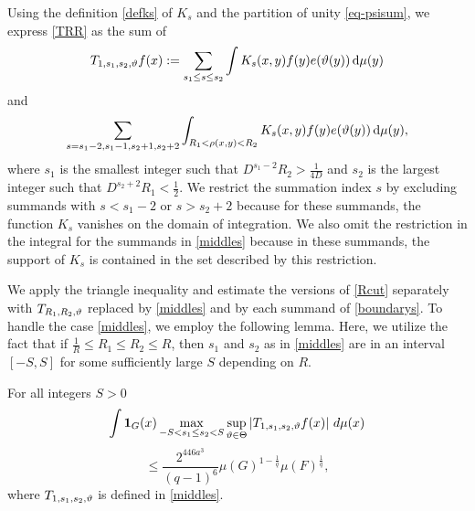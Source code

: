 Using the definition \eqref{defks} of $K_s$ and the partition of unity \eqref{eq-psisum}, we express \eqref{TRR} as the sum of
\begin{equation}\label{middles}
{T}_{1,s_1,s_2,{\vartheta}}f(x):=\sum_{s_1 \le s\le s_2}
\int K_s(x,y) f(y) e({\vartheta}(y)) \, \mathrm{d}\mu(y)
\end{equation}
and
\begin{equation}\label{boundarys}
\sum_{s=s_1-2,s_1-1, s_2+1, s_2+2}
\int_{R_1 < \rho(x,y) < R_2} K_s(x,y) f(y) e({\vartheta}(y)) \,
 \mathrm{d}\mu(y),
\end{equation}
where $s_1$ is the smallest integer such that $D^{s_1-2}R_2>\frac 1{4D}$ and $s_2$ is the largest integer such that $D^{s_2+2}R_1<\frac 12$. We restrict the summation index $s$ by excluding summands with $s<s_1-2$ or $s>s_2+2$ because for these summands, the function $K_s$ vanishes on the domain of integration. We also omit the restriction in the integral for the summands in \eqref{middles} because in these summands, the support of $K_s$ is contained in the set described by this restriction.

We apply the triangle inequality and estimate the versions of \eqref{Rcut} separately with $T_{R_1,R_2,{\vartheta}}$ replaced by \eqref{middles} and by each summand of \eqref{boundarys}. To handle the case \eqref{middles}, we employ the following lemma. Here, we utilize the fact that if $\frac 1R\le R_1\le R_2\le R$, then $s_1$ and $s_2$ as in \eqref{middles} are in an interval $[-S,S]$ for some sufficiently large $S$ depending on $R$.


\begin{lemma}[S truncation]
    \label{S-truncation}
    For all integers $S>0$
    $$
        \int \mathbf{1}_{G}(x)
        \max_{-S<s_1\le s_2<S}\sup_{{\vartheta}\in{\Theta}}
        \left| T_{1, s_1,s_2,{\vartheta}} f(x) \right|\, d\mu(x)
    $$
    \begin{equation} \label{Scut}
        \leq \frac{2^{446a^3}}{(q-1)^6} \mu(G)^{1 - \frac{1}{q}} \mu(F)^{\frac{1}{q}},
    \end{equation}
    where $T_{1, s_1,s_2,{\vartheta}}$ is defined in \eqref{middles}.
\end{lemma}

